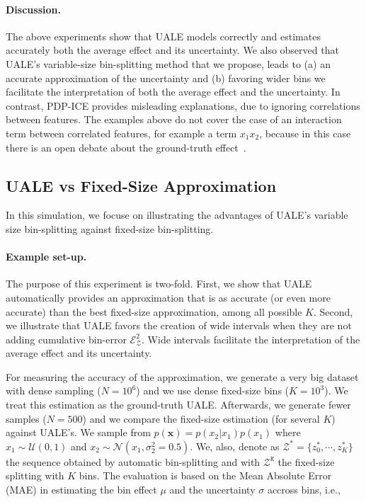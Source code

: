 \documentclass[twoside]{article}
\begin{document}
\paragraph{Discussion.}

The above experiments show that UALE models correctly and estimates
accurately both the average effect and its uncertainty. We also
observed that UALE's variable-size bin-splitting method that we
propose, leads to (a) an accurate approximation of the uncertainty and
(b) favoring wider bins we facilitate the interpretation of both the
average effect and the uncertainty. In contrast, PDP-ICE provides
misleading explanations, due to ignoring correlations between
features. The examples above do not cover the case of an interaction
term between correlated features, for example a term \(x_1x_2\),
because in this case there is an open debate about the ground-truth
effect~\citep{Gromping2020MAEP}.

\subsection{UALE vs Fixed-Size Approximation}
\label{sec:simulation-examples-2}

In this simulation, we focuse on illustrating the advantages of UALE's
variable size bin-splitting against fixed-size bin-splitting.

\paragraph{Example set-up.}
The purpose of this experiment is two-fold. First, we show that UALE
automatically provides an approximation that is as accurate (or even
more accurate) than the best fixed-size approximation, among all
possible \(K\). Second, we illustrate that UALE favors the creation of
wide intervals when they are not adding cumulative bin-error
\(\mathcal{E}^2_{\mathcal{Z}}\). Wide intervals facilitate the
interpretation of the average effect and its uncertainty.

For measuring the accuracy of the approximation, we generate a very
big dataset with dense sampling (\(N=10^6\)) and we use dense
fixed-size bins (\(K=10^3\)). We treat this estimation as the
ground-truth UALE. Afterwards, we generate fewer samples (\(N=500\))
and we compare the fixed-size estimation (for several \(K\)) against
UALE's. We sample from \(p(\mathbf{x}) = p(x_2|x_1)p(x_1)\) where
\(x_1 \sim \mathcal{U}(0,1)\) and
\(x_2 \sim \mathcal{N}(x_1, \sigma_2^2=0.5)\). We, also, denote as
\(\mathcal{Z^*} = \{z^*_0, \cdots, z^*_K\}\) the sequence obtained by
automatic bin-splitting and with \(\mathcal{Z^{\mathtt{K}}}\) the
fixed-size splitting with \(K\) bins. The evaluation is based on the
Mean Absolute Error (MAE) in estimating the bin effect \(\mu\) and the
uncertainty \(\sigma\) accross bins, i.e.,
\end{document}
